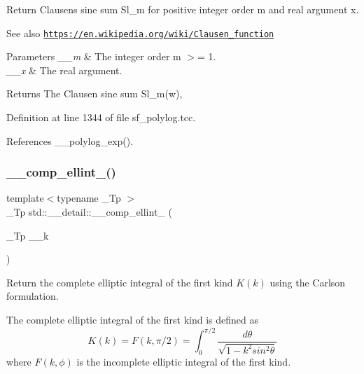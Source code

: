 Return Clausen\textquotesingle{}s sine sum Sl\+\_\+m for positive integer order m and real argument x. \begin{DoxySeeAlso}{See also}
\href{https://en.wikipedia.org/wiki/Clausen_function}{\tt https\+://en.\+wikipedia.\+org/wiki/\+Clausen\+\_\+function}
\end{DoxySeeAlso}

\begin{DoxyParams}{Parameters}
{\em \+\_\+\+\_\+m} & The integer order m $>$= 1. \\
\hline
{\em \+\_\+\+\_\+x} & The real argument. \\
\hline
\end{DoxyParams}
\begin{DoxyReturn}{Returns}
The Clausen sine sum Sl\+\_\+m(w), 
\end{DoxyReturn}


Definition at line 1344 of file sf\+\_\+polylog.\+tcc.



References \+\_\+\+\_\+polylog\+\_\+exp().

\mbox{\label{namespacestd_1_1____detail_a7b23bcf7e9f20b1e353a047126e13af1}} 
\subsubsection{\texorpdfstring{\+\_\+\+\_\+comp\+\_\+ellint\+\_()}{\_\_comp\_ellint\_1()}}
{\footnotesize\ttfamily template$<$typename \+\_\+\+Tp $>$ \\
\+\_\+\+Tp std\+::\+\_\+\+\_\+detail\+::\+\_\+\+\_\+comp\+\_\+ellint\+\_ (\begin{DoxyParamCaption}\item[{\+\_\+\+Tp}]{\+\_\+\+\_\+k }\end{DoxyParamCaption})}



Return the complete elliptic integral of the first kind $ K(k) $ using the Carlson formulation. 

The complete elliptic integral of the first kind is defined as \[ K(k) = F(k,\pi/2) = \int_0^{\pi/2}\frac{d\theta} {\sqrt{1 - k^2 sin^2\theta}} \] where $ F(k,\phi) $ is the incomplete elliptic integral of the first kind.


